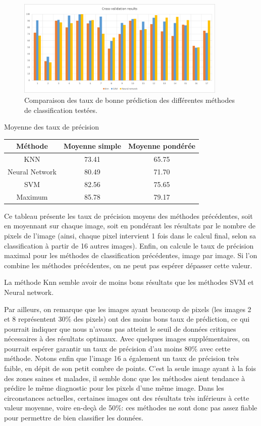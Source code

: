 \documentclass[a4paper,10pt]{report}
\begin{document}
\begin{figure}[htbp]
  \caption{Comparaison des taux de bonne prédiction des différentes méthodes de classification testées.}
  \centering
  \includegraphics[width=10cm]{Compared_CV.png}
\end{figure}

\begin{center}
Moyenne des taux de précision\\

\begin{tabular}{|c|c|c|}  
  \hline
  Méthode & Moyenne simple & Moyenne pondérée\\
  \hline
  KNN & 73.41 & 65.75\\
  Neural Network & 80.49 & 71.70\\  
  SVM & 82.56 & 75.65\\
  \hline
  Maximum & 85.78 & 79.17\\
  \hline
\end{tabular}
\end{center}

Ce tableau présente les taux de précision moyens des méthodes précédentes, soit en moyennant sur chaque image, soit en pondérant les résultats par le nombre de pixels de l'image (ainsi, chaque pixel intervient 1 fois dans le calcul final, selon sa classification à partir de 16 autres images).
Enfin, on calcule le taux de précision maximal pour les méthodes de classification précédentes, image par image. Si l'on combine les méthodes précédentes, on ne peut pas espérer dépasser cette valeur.


La méthode Knn semble avoir de moins bons résultats que les méthodes SVM et Neural network. 

Par ailleurs, on remarque que les images ayant beaucoup de pixels (les images 2 et 8 représentent 30\% des pixels) ont des moins bons taux de prédiction, ce qui pourrait indiquer que nous n'avons pas atteint le seuil de données critiques nécessaires à des résultats optimaux. Avec quelques images supplémentaires, on pourrait espérer garantir un taux de précision d'au moins 80\% avec cette méthode. 
Notons enfin que l'image 16 a également un taux de précision très faible, en dépit de son petit combre de points. C'est la seule image ayant à la fois des zones saines et malades, il semble donc que les méthodes aient tendance à prédire le même diagnostic pour les pixels d'une même image.
Dans les circonstances actuelles, certaines images ont des résultats très inférieurs à cette valeur moyenne, voire en-deçà de 50\%: ces méthodes ne sont donc pas assez fiable pour permettre de bien classifier les données.

\tableofcontents


\listoffigures
\listoftables
\printindex
\end{document}
